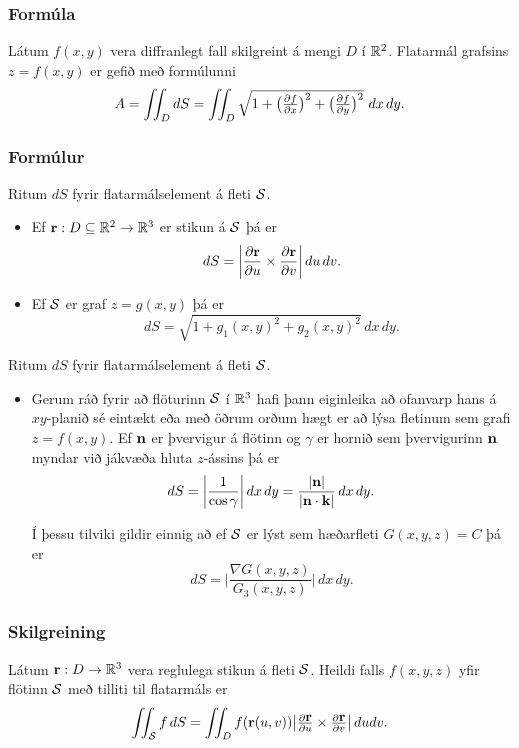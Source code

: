 \subsubsection{Formúla \rtask{}}
 Látum $f(x,y)$ vera diffranlegt fall skilgreint á
mengi $D$ í ${\mathbb R}^2$.  Flatarmál grafsins $z=f(x,y)$ er gefið með
formúlunni 
$$A=\int\!\!\!\int_D dS=\int\!\!\!\int_D {\textstyle\sqrt{1+
\big(\frac{\partial f}{\partial x}\big)^2+
\big(\frac{\partial f}{\partial y}\big)^2}}\,\,dx\,dy.$$



\subsubsection{Formúlur }

 Ritum $dS$ fyrir flatarmálselement á fleti $\cal S$.  
\begin{itemize}
\item Ef $\mbox{${\bf r}$}:D\subseteq{\mathbb R}^2\rightarrow {\mathbb R}^3$ er stikun á $\cal S$ þá
  er $$dS=\bigg|\frac{\partial \mbox{${\bf r}$}}{\partial u}\times\frac{\partial
  \mbox{${\bf r}$}}{\partial v}\bigg|\,du\,dv.$$
\item Ef $\cal S$ er graf $z=g(x,y)$ þá er 
$$dS=\sqrt{1+g_1(x,y)^2+g_2(x,y)^2}\,dx\,dy.$$


\end{itemize}


 Ritum $dS$ fyrir flatarmálselement á fleti $\cal S$.  
\begin{itemize}
\item Gerum ráð fyrir að flöturinn $\cal S$ í ${\mathbb R}^3$ hafi þann eiginleika að
  ofanvarp hans á $xy$-planið sé eintækt eða með öðrum orðum hægt er
  að lýsa fletinum sem grafi $z=f(x,y)$.
Ef $\mbox{${\bf n}$}$ er þvervigur á
flötinn og $\gamma$ er hornið sem þvervigurinn $\mbox{${\bf n}$}$ myndar við
jákvæða hluta $z$-ássins þá er 
$$dS=\bigg|\frac{1}{\cos\gamma}\bigg|\,dx\,dy
=\frac{|\mbox{${\bf n}$}|}{|\mbox{${\bf n}$}\cdot\mbox{${\bf k}$}|}\,dx\,dy.$$

Í þessu tilviki gildir einnig að ef $\cal S$ er lýst sem 
hæðarfleti $G(x,y,z)=C$ þá er 
$$dS=\bigg|\frac{\nabla G(x,y,z)}{G_3(x,y,z)}\bigg|\,dx\,dy.$$
\end{itemize}






\subsubsection{Skilgreining \rtask{}}
 Látum $\mbox{${\bf r}$}: D\rightarrow {\mathbb R}^3$ vera
reglulega stikun á fleti $\cal S$.   
Heildi falls $f(x,y,z)$ yfir flötinn $\cal S$ með tilliti til flatarmáls er
$$\int\!\!\!\int_{\cal S} f\,dS=\int\!\!\!\int_D f(\mbox{${\bf r}$}(u,v)) \big|{\textstyle\frac{\partial
    \mbox{${\bf r}$}}{\partial u} 
\times\frac{\partial \mbox{${\bf r}$}}{\partial v}}\big|\,dudv.$$



